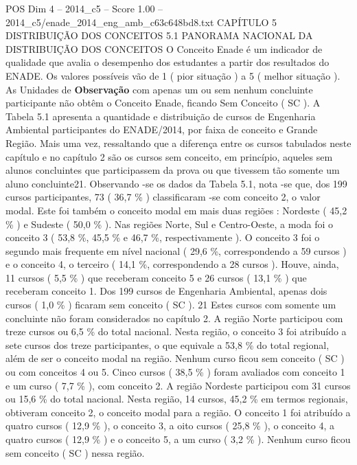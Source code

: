 \begin{textsample}{POS Dim 4 – 2014\_c5 – Score 1.00 – 2014\_c5/enade\_2014\_eng\_amb\_c63c648bd8.txt}  \label{ex:f4_pos_158}
CAPÍTULO 5 DISTRIBUIÇÃO DOS CONCEITOS 5.1 PANORAMA NACIONAL DA DISTRIBUIÇÃO DOS CONCEITOS O Conceito Enade é um indicador de qualidade que avalia o desempenho dos estudantes a partir dos resultados do ENADE.
Os valores possíveis vão de 1 ( pior situação ) a 5 ( melhor situação ).
As Unidades de \textbf{Observação} com apenas um ou sem nenhum concluinte participante não obtêm o Conceito Enade, ficando Sem Conceito ( SC ).
A Tabela 5.1 apresenta a quantidade e distribuição de cursos de Engenharia Ambiental participantes do ENADE/2014, por faixa de conceito e Grande Região.
Mais uma vez, ressaltando que a diferença entre os cursos tabulados neste capítulo e no capítulo 2 são os cursos sem conceito, em princípio, aqueles sem alunos concluintes que participassem da prova ou que tivessem tão somente um aluno concluinte21.
Observando -se os dados da Tabela 5.1, nota -se que, dos 199 cursos participantes, 73 ( 36,7 \% ) classificaram -se com conceito 2, o valor modal.
Este foi também o conceito modal em mais duas regiões : Nordeste ( 45,2 \% ) e Sudeste ( 50,0 \% ).
Nas regiões Norte, Sul e Centro-Oeste, a moda foi o conceito 3 ( 53,8 \%, 45,5 \% e 46,7 \%, respectivamente ).
O conceito 3 foi o segundo mais frequente em nível nacional ( 29,6 \%, correspondendo a 59 cursos ) e o conceito 4, o terceiro ( 14,1 \%, correspondendo a 28 cursos ).
Houve, ainda, 11 cursos ( 5,5 \% ) que receberam conceito 5 e 26 cursos ( 13,1 \% ) que receberam conceito 1.
Dos 199 cursos de Engenharia Ambiental, apenas dois cursos ( 1,0 \% ) ficaram sem conceito ( SC ). 21 Estes cursos com somente um concluinte não foram considerados no capítulo 2.
A região Norte participou com treze cursos ou 6,5 \% do total nacional.
Nesta região, o conceito 3 foi atribuído a sete cursos dos treze participantes, o que equivale a 53,8 \% do total regional, além de ser o conceito modal na região.
Nenhum curso ficou sem conceito ( SC ) ou com conceitos 4 ou 5.
Cinco cursos ( 38,5 \% ) foram avaliados com conceito 1 e um curso ( 7,7 \% ), com conceito 2.
A região Nordeste participou com 31 cursos ou 15,6 \% do total nacional.
Nesta região, 14 cursos, 45,2 \% em termos regionais, obtiveram conceito 2, o conceito modal para a região.
O conceito 1 foi atribuído a quatro cursos ( 12,9 \% ), o conceito 3, a oito cursos ( 25,8 \% ), o conceito 4, a quatro cursos ( 12,9 \% ) e o conceito 5, a um curso ( 3,2 \% ).
Nenhum curso ficou sem conceito ( SC ) nessa região.

\end{textsample}
